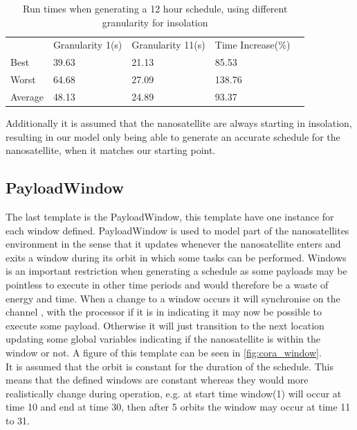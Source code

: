\begin{table}[H]
	\centering
	\begin{tabular}{lllll}
		& Granularity 1(s)           & Granularity 11(s)          & Time Increase(\%)           &  \\ \cline{2-4}
		\multicolumn{1}{l|}{Best}    & \multicolumn{1}{l|}{39.63} & \multicolumn{1}{l|}{21.13} & \multicolumn{1}{l|}{85.53}  &  \\
		\multicolumn{1}{l|}{Worst}   & \multicolumn{1}{l|}{64.68} & \multicolumn{1}{l|}{27.09} & \multicolumn{1}{l|}{138.76} &  \\
		\multicolumn{1}{l|}{Average} & \multicolumn{1}{l|}{48.13} & \multicolumn{1}{l|}{24.89} & \multicolumn{1}{l|}{93.37}  &  \\ \cline{2-4}
	\end{tabular}
		\caption{Run times when generating a 12 hour schedule, using different granularity for insolation}
		\label{tab:runTimes}
\end{table}
		
Additionally it is assumed that the nanosatellite are always starting in insolation, resulting in our model only being able to generate an accurate schedule for the nanosatellite, when it matches our starting point.


\subsection*{PayloadWindow}\label{ssec:cora_tw}
The last template is the PayloadWindow, this template have one instance for each window defined. PayloadWindow is used to model part of the nanosatellites environment in the sense that it updates whenever the nanosatellite enters and exits a window during its orbit in which some tasks can be performed. Windows is an important restriction when generating a schedule as some payloads may be pointless to execute in other time periods and would therefore be a waste of energy and time. When a change to a window occurs it will synchronise on the channel , with the processor if it is in  indicating it may now be possible to execute some payload. Otherwise it will just transition to the next location updating some global variables indicating if the nanosatellite is within the window or not. 
A figure of this template can be seen in \cref{fig:cora_window}.\\
It is assumed that the orbit is constant for the duration of the schedule. This means that the defined windows are constant whereas they would more realistically change during operation, e.g. at start time window(1) will occur at time 10 and end at time 30, then after 5 orbits the window may occur at time 11 to 31.
